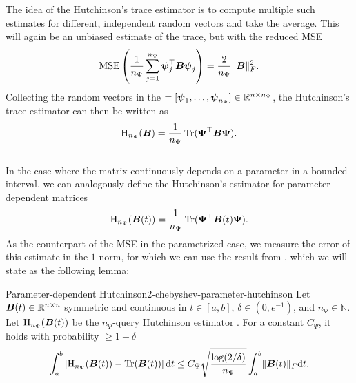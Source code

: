 The idea of the Hutchinson's trace estimator is to compute multiple such estimates
for different, independent random vectors and take the average. This will again
be an unbiased estimate of the trace, but with the reduced \gls{MSE}
\begin{equation}
    \operatorname{MSE}\left( \frac{1}{n_{\Psi}} \sum_{j=1}^{n_{\Psi}}\boldsymbol{\psi}_j^{\top} \boldsymbol{B} \boldsymbol{\psi}_j\right) = \frac{2}{n_{\Psi}} \lVert \boldsymbol{B} \rVert _F^2.
    \label{equ:2-chebyshev-hutchinson-mse}
\end{equation}
Collecting the random vectors in the
 $= [\boldsymbol{\psi}_1, \dots, \boldsymbol{\psi}_{n_{\Psi}}] \in \mathbb{R}^{n \times n_{\Psi}}$,
the Hutchinson's trace estimator can then be written as
\begin{equation}
    \operatorname{H}_{n_{\Psi}}(\boldsymbol{B}) = \frac{1}{n_{\Psi}} \operatorname{Tr}(\boldsymbol{\Psi}^{\top} \boldsymbol{B} \boldsymbol{\Psi}).
    \label{equ:2-chebyshev-DGC-hutchionson-estimator}
\end{equation}\\

In the case where the matrix continuously depends on a parameter in a bounded 
interval, we can analogously define the Hutchinson's estimator for parameter-dependent
matrices
\begin{equation}
    \operatorname{H}_{n_{\Psi}}(\boldsymbol{B}(t)) = \frac{1}{n_{\Psi}} \operatorname{Tr}(\boldsymbol{\Psi}^{\top} \boldsymbol{B}(t) \boldsymbol{\Psi}).
    \label{equ:2-chebyshev-DGC-hutchionson-estimator-parameter}
\end{equation}
As the counterpart of the \gls{MSE} in the parametrized case, we measure the
error of this estimate in the $1$-norm, for which we can use the result
from , which we will state as the following lemma:
\begin{lemma}{Parameter-dependent Hutchinson}{2-chebyshev-parameter-hutchinson}
    Let $\boldsymbol{B}(t) \in \mathbb{R}^{n \times n}$ symmetric and continuous in
    $t \in [a, b]$, $\delta \in (0, e^{-1})$, and $n_{\Psi} \in \mathbb{N}$.
    Let $\operatorname{H}_{n_{\Psi}}(\boldsymbol{B}(t))$ be the $n_{\Psi}$-query
    Hutchinson estimator .
    For a constant $C_{\Psi}$, it holds with probability $\geq 1 - \delta$
    \begin{equation}
        \int_{a}^{b} \left| \operatorname{H}_{n_{\Psi}}(\boldsymbol{B}(t))  - \operatorname{Tr}(\boldsymbol{B}(t)) \right| \mathrm{d}t \leq C_{\Psi} \sqrt{\frac{\log(2/\delta)}{n_{\Psi}}} \int_{a}^{b} \lVert \boldsymbol{B}(t) \rVert _F \mathrm{d}t.
    \end{equation}
\end{lemma}


